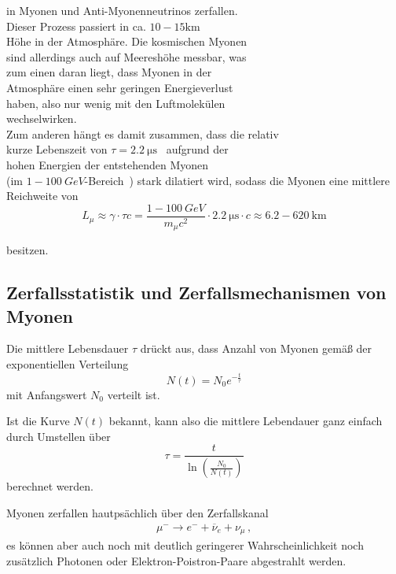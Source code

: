 in Myonen und Anti-Myonenneutrinos zerfallen. \\
Dieser Prozess passiert in ca. $10-15 \mathrm{km}$~\cite[200]{ATP2} \\
Höhe in der Atmosphäre. 
Die kosmischen Myonen \\ 
sind allerdings auch auf Meereshöhe messbar, was \\
zum einen daran liegt, dass Myonen in der \\
Atmosphäre einen sehr geringen Energieverlust \\
haben, also nur wenig mit den Luftmolekülen \\
wechselwirken.\\
Zum anderen hängt es damit zusammen, dass die relativ \\
kurze Lebenszeit von $\tau = \qty{2.2}{\micro\second}$~\cite{Myon} aufgrund der \\
hohen Energien der entstehenden Myonen \\
(im $1-\qty{100}{GeV}$-Bereich~\cite{ATP2}) stark dilatiert wird, sodass die Myonen eine mittlere Reichweite von 
\begin{equation}
    L_\mu \approx \gamma \cdot \tau  c = \frac{1-\qty{100}{GeV}}{m_\mu c^2} \cdot \qty{2.2}{\micro\second} \cdot c \approx  6.2-\qty{620}{\kilo\meter}
\end{equation}

besitzen. 

\subsection{Zerfallsstatistik und Zerfallsmechanismen von Myonen}

Die mittlere Lebensdauer $\tau$ drückt aus, dass Anzahl von Myonen gemäß der exponentiellen Verteilung 
\begin{equation}
    N(t) = N_0 e^{-\frac{t}{\tau}}
    \label{eq:exp_verteilung}
\end{equation}
mit Anfangswert $N_0$ verteilt ist. 

Ist die Kurve $N(t)$ bekannt, kann also die mittlere Lebendauer ganz einfach durch Umstellen über 
\begin{equation}
    \tau = \frac{t}{\ln(\frac{N_0}{N(t)})}
    \label{eq:tau}
\end{equation}
berechnet werden.

Myonen zerfallen hautpsächlich über den Zerfallskanal
\begin{align*}
    \mu^{-} \rightarrow e^{-} + \overbar{\nu}_e + \nu_{\mu} \, ,
\end{align*}
es können aber auch noch mit deutlich geringerer Wahrscheinlichkeit noch zusätzlich Photonen oder Elektron-Poistron-Paare abgestrahlt werden. \\

